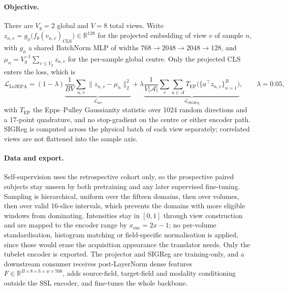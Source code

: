 \documentclass[11pt,a4paper]{article}
\begin{document}
\paragraph{Objective.} There are $V_g = 2$ global and $V = 8$ total views. Write
$z_{n,v} = g_\phi\big(f_\theta(v_{n,v})_{\text{CLS}}\big) \in \mathbb{R}^{128}$ for the projected
embedding of view $v$ of sample $n$, with $g_\phi$ a shared BatchNorm MLP of widths
$768 \to 2048 \to 2048 \to 128$, and $\mu_n = V_g^{-1}\sum_{v \le V_g} z_{n,v}$ for the per-sample
global centre. Only the projected CLS enters the loss, which is~\cite{lejepa}
\begin{equation}
  \mathcal{L}_{\text{LeJEPA}}
  = (1-\lambda)\underbrace{\frac{1}{BV}\sum_{n,v}\lVert z_{n,v}-\mu_n\rVert_2^2}_{\mathcal{L}_{\text{inv}}}
  + \lambda\underbrace{\frac{1}{V|\mathcal{A}|}\sum_{v}\sum_{a\in\mathcal{A}}
    T_{\text{EP}}\big(\{a^\top z_{n,v}\}_{n=1}^{B}\big)}_{\mathcal{L}_{\text{SIGReg}}},
  \qquad \lambda = 0.05,
\end{equation}
with $T_{\text{EP}}$ the Epps--Pulley Gaussianity statistic over 1024 random directions and a 17-point
quadrature, and no stop-gradient on the centre or either encoder path. SIGReg is computed across the
physical batch of each view separately; correlated views are not flattened into the sample axis.

\paragraph{Data and export.} Self-supervision uses the retrospective cohort only, so the prospective
paired subjects stay unseen by both pretraining and any later supervised fine-tuning. Sampling is
hierarchical, uniform over the fifteen domains, then over volumes, then over valid 16-slice intervals,
which prevents the domains with more eligible windows from dominating. Intensities stay in $[0,1]$
through view construction and are mapped to the encoder range by $x_{\text{enc}} = 2x - 1$; no per-volume
standardisation, histogram matching or field-specific normalisation is applied, since those would erase
the acquisition appearance the translator needs. Only the tubelet encoder is exported. The projector and
SIGReg are training-only, and a downstream consumer receives post-LayerNorm dense features
$F \in \mathbb{R}^{B\times8\times h\times w\times768}$, adds source-field, target-field and modality
conditioning outside the SSL encoder, and fine-tunes the whole backbone.
\end{document}
